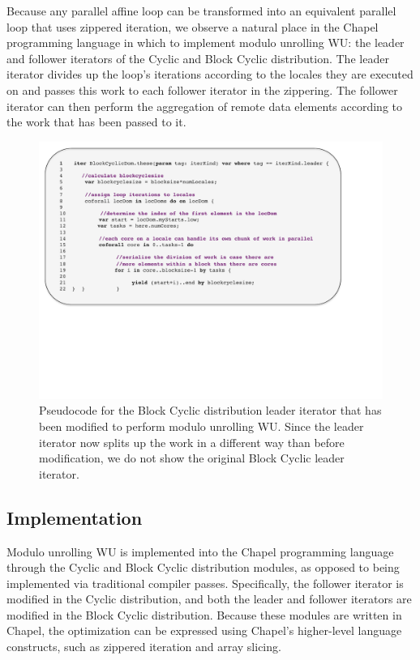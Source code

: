Because any parallel affine loop can be transformed into an equivalent parallel loop that uses zippered iteration, we observe a natural place in the Chapel programming language in which to implement modulo unrolling WU: the leader and follower iterators of the Cyclic and Block Cyclic distribution. The leader iterator divides up the loop's iterations according to the locales they are executed on and passes this work to each follower iterator in the zippering. The follower iterator can then perform the aggregation of remote data elements according to the work that has been passed to it. 

\begin{figure}
\begin{center}
\includegraphics[width=\linewidth]{./Figures/block_cyc_muwu_leader}
\caption{Pseudocode for the Block Cyclic distribution leader iterator that has been modified to perform modulo unrolling WU. Since the leader iterator now splits up the work in a different way than before modification, we do not show the original Block Cyclic leader iterator.}
\label{block_cyc_muwu_leader}
\end{center}
\end{figure}

\subsection{Implementation}\label{subsec:cyclic_modulo}

Modulo unrolling WU is implemented into the Chapel programming language through the Cyclic and Block Cyclic distribution modules, as opposed to being implemented via traditional compiler passes. Specifically, the follower iterator is modified in the Cyclic distribution, and both the leader and follower iterators are modified in the Block Cyclic distribution. Because these modules are written in Chapel, the optimization can be expressed using Chapel's higher-level language constructs, such as zippered iteration and array slicing. 

